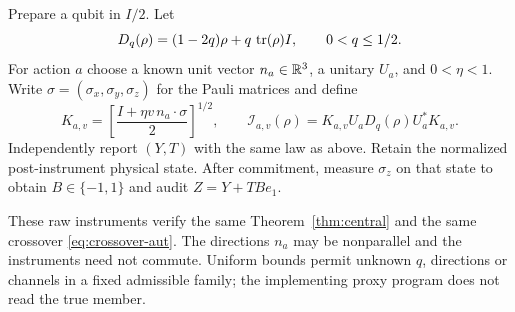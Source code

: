 \begin{theorem}\label{thm:quantum}
Prepare a qubit in $I/2$. Let
\[
 D_q(\rho)=(1-2q)\rho+q\,\operatorname{tr}(\rho)I,
\qquad0<q\le1/2.
\]
For action $a$ choose a known unit vector $n_a\in\mathbb R^3$, a unitary $U_a$, and $0<\eta<1$. Write $\sigma=(\sigma_x,\sigma_y,\sigma_z)$ for the Pauli matrices and define
\[
 K_{a,v}=\left[\frac{I+\eta v\,n_a\cdot\sigma}{2}\right]^{1/2},
 \qquad
 \mathcal I_{a,v}(\rho)=K_{a,v}U_aD_q(\rho)U_a^*K_{a,v}.
\]
Independently report $(Y,T)$ with the same law as above. Retain the normalized post-instrument physical state. After commitment, measure $\sigma_z$ on that state to obtain $B\in\{-1,1\}$ and audit $Z=Y+TB e_1$.

These raw instruments verify the same Theorem~\ref{thm:central} and the same crossover \eqref{eq:crossover-aut}. The directions $n_a$ may be nonparallel and the instruments need not commute. Uniform bounds permit unknown $q$, directions or channels in a fixed admissible family; the implementing proxy program does not read the true member.
\end{theorem}
